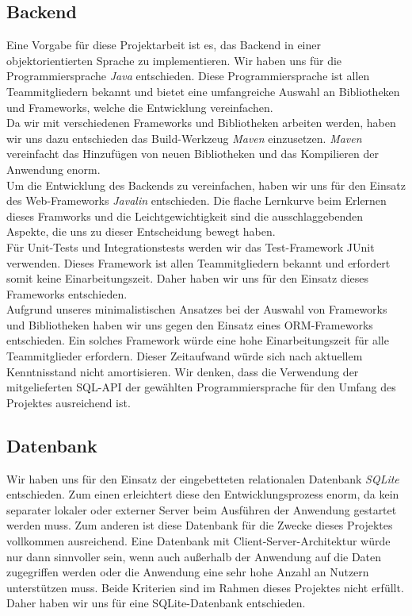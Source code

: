 \documentclass{article}
\begin{document}
\subsection{Backend}
Eine Vorgabe für diese Projektarbeit ist es, das Backend in einer objektorientierten Sprache zu implementieren.
Wir haben uns für die Programmiersprache \textit{Java} entschieden.
Diese Programmiersprache ist allen Teammitgliedern bekannt und bietet eine umfangreiche Auswahl an Bibliotheken und Frameworks, welche die Entwicklung vereinfachen.\\
Da wir mit verschiedenen Frameworks und Bibliotheken arbeiten werden, haben wir uns dazu entschieden das Build-Werkzeug \textit{Maven} einzusetzen.
\textit{Maven} vereinfacht das Hinzufügen von neuen Bibliotheken und das Kompilieren der Anwendung enorm.\\
Um die Entwicklung des Backends zu vereinfachen, haben wir uns für den Einsatz des Web-Frameworks \textit{Javalin} entschieden.
Die flache Lernkurve beim Erlernen dieses Framworks und die Leichtgewichtigkeit sind die ausschlaggebenden Aspekte, die uns zu dieser Entscheidung bewegt haben.\\
Für Unit-Tests und Integrationstests werden wir das Test-Framework JUnit verwenden.
Dieses Framework ist allen Teammitgliedern bekannt und erfordert somit keine Einarbeitungszeit.
Daher haben wir uns für den Einsatz dieses Frameworks entschieden.\\
Aufgrund unseres minimalistischen Ansatzes bei der Auswahl von Frameworks und Bibliotheken haben wir uns gegen den Einsatz eines ORM-Frameworks entschieden.
Ein solches Framework würde eine hohe Einarbeitungszeit für alle Teammitglieder erfordern.
Dieser Zeitaufwand würde sich nach aktuellem Kenntnisstand nicht amortisieren.
Wir denken, dass die Verwendung der mitgelieferten SQL-API der gewählten Programmiersprache für den Umfang des Projektes ausreichend ist.

\subsection{Datenbank}
Wir haben uns für den Einsatz der eingebetteten relationalen Datenbank \textit{SQLite} entschieden.
Zum einen erleichtert diese den Entwicklungsprozess enorm, da kein separater lokaler oder externer Server beim Ausführen der Anwendung gestartet werden muss.
Zum anderen ist diese Datenbank für die Zwecke dieses Projektes vollkommen ausreichend.
Eine Datenbank mit Client-Server-Architektur würde nur dann sinnvoller sein, wenn auch außerhalb der Anwendung auf die Daten zugegriffen werden oder die Anwendung eine sehr hohe Anzahl an Nutzern unterstützen muss.
Beide Kriterien sind im Rahmen dieses Projektes nicht erfüllt.
Daher haben wir uns für eine SQLite-Datenbank entschieden.
\end{document}
